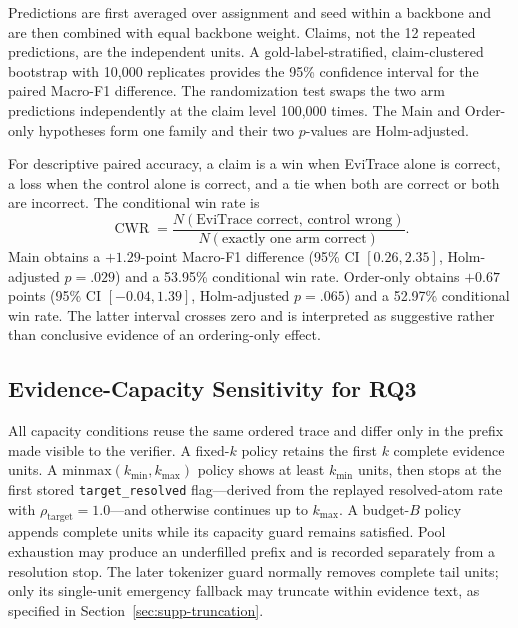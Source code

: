 Predictions are first averaged over assignment and seed within a backbone
and are then combined with equal backbone weight.  Claims, not the 12
repeated predictions, are the independent units.  A
gold-label-stratified, claim-clustered bootstrap with 10,000 replicates
provides the 95\% confidence interval for the paired Macro-F1 difference.
The randomization test swaps the two arm predictions independently at the
claim level 100,000 times.  The Main and Order-only hypotheses form one
family and their two \(p\)-values are Holm-adjusted.

For descriptive paired accuracy, a claim is a win when EviTrace alone is
correct, a loss when the control alone is correct, and a tie when both are
correct or both are incorrect.  The conditional win rate is
\begin{equation}
\operatorname{CWR} =
\frac{N(\text{EviTrace correct, control wrong})}
{N(\text{exactly one arm correct})}.
\end{equation}
Main obtains a \(+1.29\)-point Macro-F1 difference
(95\% CI \([0.26,2.35]\), Holm-adjusted \(p=.029\)) and a 53.95\%
conditional win rate.  Order-only obtains \(+0.67\) points
(95\% CI \([-0.04,1.39]\), Holm-adjusted \(p=.065\)) and a 52.97\%
conditional win rate.  The latter interval crosses zero and is interpreted
as suggestive rather than conclusive evidence of an ordering-only effect.

\subsection{Evidence-Capacity Sensitivity for RQ3}
\label{sec:supp-rq3}

All capacity conditions reuse the same ordered trace and differ only in the
prefix made visible to the verifier.  A fixed-\(k\) policy retains the first
\(k\) complete evidence units.  A minmax\((k_{\min},k_{\max})\) policy
shows at least \(k_{\min}\) units, then stops at the first stored
\texttt{target\_resolved} flag---derived from the replayed resolved-atom
rate with \(\rho_{\mathrm{target}}=1.0\)---and otherwise continues up to
\(k_{\max}\).  A budget-\(B\) policy appends complete units while its
capacity guard remains satisfied.  Pool exhaustion may produce an
underfilled prefix and is recorded separately from a resolution stop.  The
later tokenizer guard normally removes complete tail units; only its
single-unit emergency fallback may truncate within evidence text, as
specified in Section~\ref{sec:supp-truncation}.


